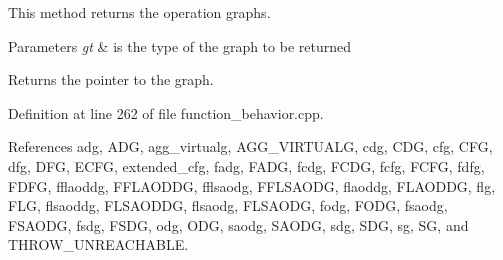 This method returns the operation graphs. 


\begin{DoxyParams}{Parameters}
{\em gt} & is the type of the graph to be returned \\
\hline
\end{DoxyParams}
\begin{DoxyReturn}{Returns}
the pointer to the graph. 
\end{DoxyReturn}


Definition at line 262 of file function\+\_\+behavior.\+cpp.



References adg, A\+DG, agg\+\_\+virtualg, A\+G\+G\+\_\+\+V\+I\+R\+T\+U\+A\+LG, cdg, C\+DG, cfg, C\+FG, dfg, D\+FG, E\+C\+FG, extended\+\_\+cfg, fadg, F\+A\+DG, fcdg, F\+C\+DG, fcfg, F\+C\+FG, fdfg, F\+D\+FG, fflaoddg, F\+F\+L\+A\+O\+D\+DG, fflsaodg, F\+F\+L\+S\+A\+O\+DG, flaoddg, F\+L\+A\+O\+D\+DG, flg, F\+LG, flsaoddg, F\+L\+S\+A\+O\+D\+DG, flsaodg, F\+L\+S\+A\+O\+DG, fodg, F\+O\+DG, fsaodg, F\+S\+A\+O\+DG, fsdg, F\+S\+DG, odg, O\+DG, saodg, S\+A\+O\+DG, sdg, S\+DG, sg, SG, and T\+H\+R\+O\+W\+\_\+\+U\+N\+R\+E\+A\+C\+H\+A\+B\+LE.



